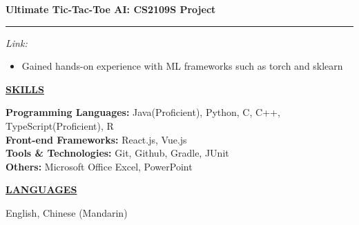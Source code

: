 \documentclass{article}
\begin{document}
\indent \textbf{Ultimate Tic-Tac-Toe AI: CS2109S Project} \\
\vspace{-0.7cm} %

\indent\rule{\linewidth}{0.4pt} %
\indent \textit{Link:} 
\vspace{0.0cm}
\begin{adjustwidth}{2.5em}{0pt}
\begin{itemize}[leftmargin=*, itemsep=1pt, parsep=0pt]
  \item Gained hands-on experience with ML frameworks such as torch and sklearn
\end{itemize}
\end{adjustwidth}
\vspace{0.2cm}
\noindent \textbf{\underline{SKILLS}} \\
\vspace{-0.4cm}

\indent \textbf{Programming Languages:} Java(Proficient), Python, C, C++, TypeScript(Proficient), R\\
\indent \textbf{Front-end Frameworks:} React.js, Vue.js\\
\indent \textbf{Tools \& Technologies:} Git, Github, Gradle, JUnit\\
\indent \textbf{Others:}  Microsoft Office Excel, PowerPoint\\
\vspace{-0.2cm}

\noindent \textbf{\underline{LANGUAGES}} \\
\vspace{-0.4cm}

English, Chinese (Mandarin)\\
\vspace{-0.2cm}
\end{document}
